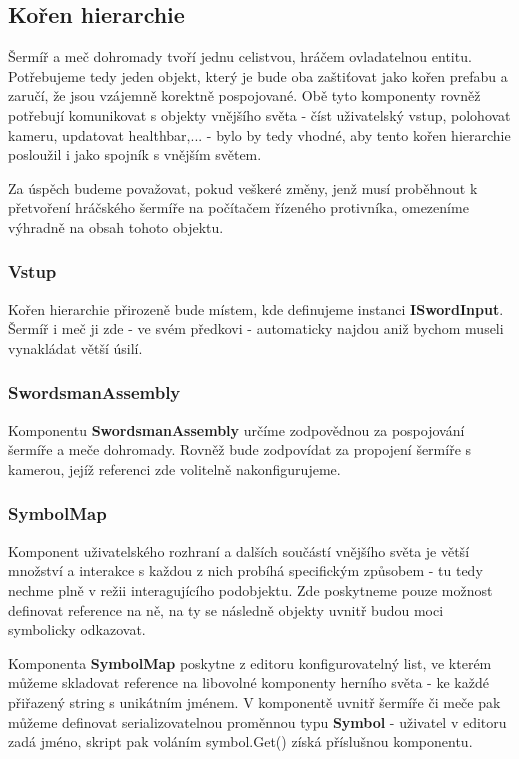 \subsection{Kořen hierarchie} 

Šermíř a meč dohromady tvoří jednu celistvou, hráčem ovladatelnou entitu. Potřebujeme tedy jeden objekt, který je bude oba zaštiťovat jako kořen prefabu a zaručí, že jsou vzájemně korektně pospojované. Obě tyto komponenty rovněž potřebují komunikovat s objekty vnějšího světa - číst uživatelský vstup, polohovat kameru, updatovat healthbar,... - bylo by tedy vhodné, aby tento kořen hierarchie posloužil i jako spojník s vnějším světem. 

Za úspěch budeme považovat, pokud veškeré změny, jenž musí proběhnout k přetvoření hráčského šermíře na počítačem řízeného protivníka, omezeníme výhradně na obsah tohoto objektu.

\subsubsection*{Vstup}

Kořen hierarchie přirozeně bude místem, kde definujeme instanci \textbf{ISwordInput}. Šermíř i meč ji zde - ve svém předkovi - automaticky najdou aniž bychom museli vynakládat větší úsilí.

\subsubsection*{SwordsmanAssembly}

Komponentu \textbf{SwordsmanAssembly} určíme zodpovědnou za pospojování šermíře a meče dohromady. Rovněž bude zodpovídat za propojení šermíře s kamerou, jejíž referenci zde volitelně nakonfigurujeme. 

\subsubsection*{SymbolMap}

Komponent uživatelského rozhraní a dalších součástí vnějšího světa je větší množství a interakce s každou z nich probíhá specifickým způsobem - tu tedy nechme plně v režii interagujícího podobjektu. Zde poskytneme pouze možnost definovat reference na ně, na ty se následně objekty uvnitř budou moci symbolicky odkazovat.

Komponenta \textbf{SymbolMap} poskytne z editoru konfigurovatelný list, ve kterém můžeme skladovat reference na libovolné komponenty herního světa - ke každé přiřazený string s unikátním jménem. V komponentě uvnitř šermíře či meče pak můžeme definovat serializovatelnou proměnnou typu \textbf{Symbol} - uživatel v editoru zadá jméno, skript pak voláním symbol.Get() získá příslušnou komponentu.


